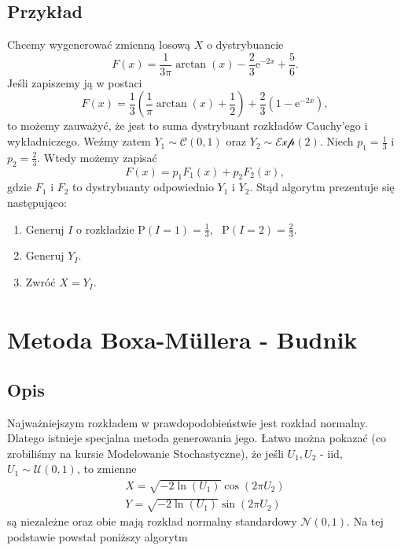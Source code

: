 \documentclass[12pt]{mwrep}
\begin{document}
	\subsection{Przykład}
	\noindent Chcemy wygenerować zmienną losową $X$ o dystrybuancie
	$$ F(x) = \frac{1}{3\pi}\arctan(x) - \frac{2}{3}\mathrm{e}^{-2x} + \frac{5}{6}. $$
	Jeśli zapiszemy ją w postaci
	$$ F(x) = \frac{1}{3}\left(\frac{1}{\pi}\arctan(x) + \frac{1}{2}\right) + \frac{2}{3}\left(1 - \mathrm{e}^{-2x}\right), $$
	to możemy zauważyć, że jest to suma dystrybuant rozkładów Cauchy'ego i wykładniczego. Weźmy zatem $Y_1 \sim \mathcal{C}(0, 1)$ oraz $Y_2 \sim \mathcal{Exp}(2)$. Niech $p_1 = \frac{1}{3}$ i $p_2 = \frac{2}{3}$. Wtedy możemy zapisać
	$$ F(x) = p_1 F_1(x) + p_2 F_2(x), $$
	gdzie $F_1$ i $F_2$ to dystrybuanty odpowiednio $Y_1$ i $Y_2$. Stąd algorytm prezentuje się następująco:
	\begin{enumerate}[leftmargin=10mm]
		\item Generuj $I$ o rozkładzie $\mathrm{P}(I = 1) = \frac{1}{3}$, \ $\mathrm{P}(I = 2) = \frac{2}{3}$.
		\item Generuj $Y_I$.
		\item Zwróć $X = Y_I$.
	\end{enumerate}



	
	\section{Metoda Boxa-M{\"u}llera\textsuperscript{\cite{box-kox}} - Budnik}
	\subsection{Opis}
	Najważniejszym rozkładem w prawdopodobieństwie jest rozkład normalny. Dlatego istnieje specjalna metoda generowania jego. Łatwo można pokazać (co zrobiliśmy na kursie Modelowanie Stochastyczne), że jeśli $U_1,U_2$ - iid, $U_1\sim\mathcal{U}(0,1)$, to zmienne
	\begin{equation}\label{eq:B-M}
		\begin{split}
			X=\sqrt{-2\ln(U_1)}\cos(2\pi U_2)\\
			Y=\sqrt{-2\ln(U_1)}\sin(2\pi U_2)
		\end{split}
	\end{equation}
	są niezależne oraz obie mają rozkład normalny standardowy $\mathcal{N}(0,1)$. Na tej podstawie powstał poniższy algorytm
\end{document}
